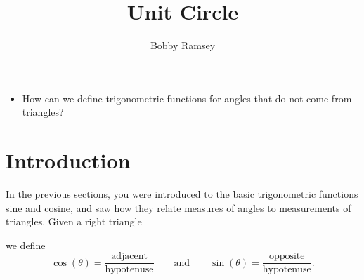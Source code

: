 \documentclass[nooutcomes]{ximera}
\author{Bobby Ramsey}
\title{Unit Circle}
\begin{document}
\begin{abstract}
	
\end{abstract}
\maketitle



\begin{motivatingQuestions}\begin{itemize}
	\item How can we define trigonometric functions for angles that do not come from triangles?
\end{itemize}\end{motivatingQuestions}

\section{Introduction}

In the previous sections, you were introduced to the basic trigonometric functions sine and cosine, and saw how they relate measures of angles to
measurements of triangles. Given a right triangle
\begin{image}%
\end{image}
we define
\[
\cos(\theta) =
\frac{\text{adjacent}}{\text{hypotenuse}}\qquad\text{and}\qquad\sin(\theta)
= \frac{\text{opposite}}{\text{hypotenuse}}.
\]
\end{document}
